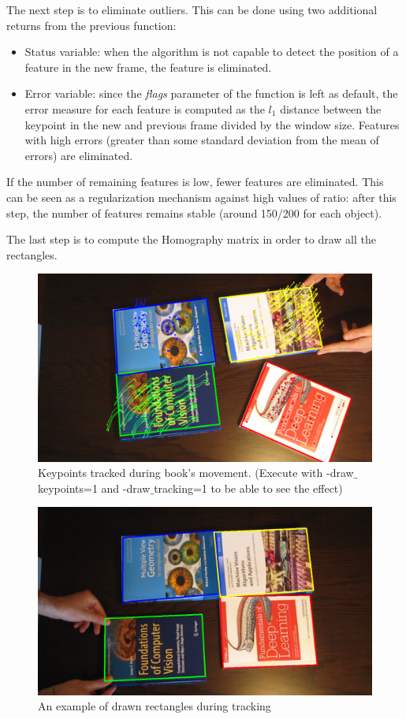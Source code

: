 \documentclass[a4paper,titlepaget]{article}
\begin{document}
The next step is to eliminate outliers. 
This can be done using two additional returns from the previous function:
\begin{itemize}
	\item Status variable: when the algorithm is not capable to detect the position of a feature in the new frame, the feature is eliminated.
	\item Error variable: since the \emph{flags} parameter of the function is left as default, the error measure for each feature is computed as the $l_1$ distance between the keypoint in the new and previous frame divided by the window size. Features with high errors (greater than some standard deviation from the mean of errors) are eliminated.
 \end{itemize}
If the number of remaining features is low, fewer features are eliminated. This can be seen as a regularization mechanism against high values of ratio: after this step, the number of features remains stable (around 150/200 for each object).

The last step is to compute the Homography matrix in order to draw all the
rectangles.

\begin{figure}[htpb]
	\centering
	\captionsetup{justification=centering}
	\includegraphics[width=.7\textwidth]{images/tracking_keypoints}
    \caption{Keypoints tracked during book's movement. (Execute with
    -draw$\_$keypoints=1 and -draw$\_$tracking=1 to be able to see the effect)}
\end{figure}
\begin{figure}[htpb]
	\centering
	\includegraphics[width=.7\textwidth]{images/tracking_rectangles}
    \caption{An example of drawn rectangles during tracking}
\end{figure}
\end{document}
